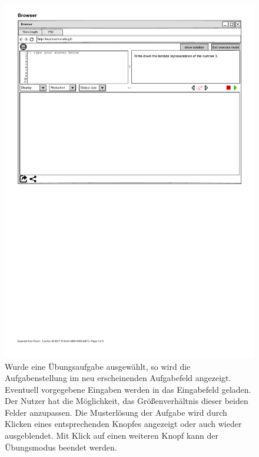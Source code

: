 \documentclass[parskip=full,11pt,twoside]{scrartcl}
\begin{document}
\begin{figure}[H]
	\centering
	\includegraphics[width=\textwidth]{img/exerciseMode}
	\caption{\label{fig:exerciseMode}Wurde eine Übungsaufgabe ausgewählt, so wird die Aufgabenstellung im neu erscheinenden Aufgabefeld angezeigt. Eventuell vorgegebene Eingaben werden in das Eingabefeld geladen. Der Nutzer hat die Möglichkeit, das Größenverhältnis dieser beiden Felder anzupassen. Die Musterlösung der Aufgabe wird durch Klicken eines entsprechenden Knopfes angezeigt oder auch wieder ausgeblendet. Mit Klick auf einen weiteren Knopf kann der Übungsmodus beendet werden.}
\end{figure}
\end{document}
